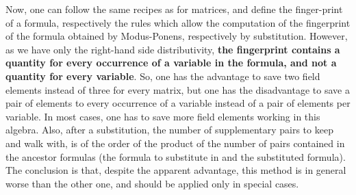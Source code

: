 \documentclass{article}
\theoremstyle{plain}
\theoremstyle{definition}
\begin{document}
Now, one can follow the same recipes as for matrices, and define the finger-print of a formula, respectively the rules which allow the computation of the fingerprint of the formula obtained by Modus-Ponens, respectively by substitution. However, as we have only the right-hand side distributivity, {\bf the fingerprint contains a quantity for every occurrence of a variable in the formula, and not a quantity for every variable}. So, one has the advantage to save two field elements instead of three for every matrix, but one has the disadvantage to save a pair of elements to every occurrence of a variable instead of a pair of elements per variable. In most cases, one has to save more field elements working in this algebra. Also, after a substitution, the number of supplementary pairs to keep and walk with, is of the order of the product of the number of pairs contained in the ancestor formulas (the formula to substitute in and the substituted formula). The conclusion is that, despite the apparent advantage, this method is in general worse than the other one, and should be applied only in special cases.   



\end{document}
